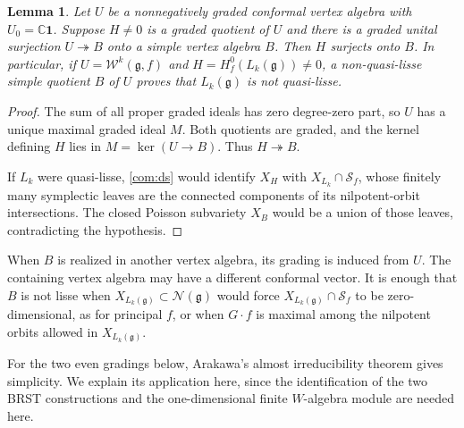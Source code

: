 \documentclass[11pt,a4paper]{amsart}
\numberwithin{equation}{section}
\newtheorem{lemma}[theorem]{Lemma}
\theoremstyle{definition}
\theoremstyle{remark}
\newcommand{\C}{\mathbb C}
\newcommand{\g}{\mathfrak g}
\newcommand{\N}{\mathcal N}
\begin{document}
\begin{lemma}\label{com:simple-image}
Let $U$ be a nonnegatively graded conformal vertex algebra with
$U_0=\C\mathbf1$. Suppose $H\ne0$ is a graded quotient of $U$
and there is a graded unital surjection $U\twoheadrightarrow B$ onto
a simple vertex algebra $B$. Then
$H$ surjects onto $B$. In particular, if
$U=\mathcal W^k(\g,f)$ and $H=H_f^0(L_k(\g))\ne0$, a
non-quasi-lisse simple quotient $B$ of $U$ proves that $L_k(\g)$ is not
quasi-lisse.
\end{lemma}
\begin{proof}
The sum of all proper graded ideals has zero degree-zero part, so
$U$ has a unique maximal graded ideal $M$. Both quotients are graded,
and the kernel defining $H$ lies in $M=\ker(U\to B)$.
Thus $H\twoheadrightarrow B$.

If $L_k$ were quasi-lisse, \cref{com:ds} would identify $X_H$ with
$X_{L_k}\cap\mathcal S_f$, whose finitely many symplectic leaves
are the connected components of its nilpotent-orbit intersections.
The closed Poisson subvariety $X_B$ would be a union of those leaves,
contradicting the hypothesis.
\end{proof}

When $B$ is realized in another vertex algebra, its grading is induced
from $U$. The containing vertex algebra may have a different conformal
vector. It is enough that $B$ is not lisse when
$X_{L_k(\g)}\subset\N(\g)$ would force
$X_{L_k(\g)}\cap\mathcal S_f$ to be zero-dimensional, as for principal
$f$, or when $G\cdot f$ is maximal among the nilpotent orbits allowed
in $X_{L_k(\g)}$.

For the two even gradings below, Arakawa's almost irreducibility
theorem \cite[Theorem~5.5.4 and Corollary~5.5.5]{Arakawa2011}
gives simplicity. We explain its application here, since the
identification of the two BRST constructions and the one-dimensional
finite $W$-algebra module are needed here.
\end{document}
